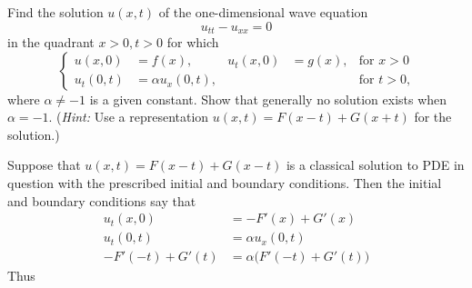 \begin{problem}
  Find the solution \(u(x,t)\) of the one-dimensional wave equation
  \[
    u_{tt}-u_{xx}=0
  \]
  in the quadrant \(x>0,t>0\) for which
  \[
    \left\{
      \begin{aligned}
        u(x,0)&=f(x),&u_t(x,0)&=g(x),&\text{for \(x>0\)}\\
        u_t(0,t)&=\alpha u_x(0,t),&&&\text{for \(t>0\),}
      \end{aligned}
    \right.
  \]
  where \(\alpha\neq -1\) is a given constant. Show that generally no
  solution exists when \(\alpha=-1\). (\emph{Hint:} Use a representation
  \(u(x,t)=F(x-t)+G(x+t)\) for the solution.)
\end{problem}
\begin{solution}
  Suppose that \(u(x,t)=F(x-t)+G(x-t)\) is a classical solution to PDE in
  question with the prescribed initial and boundary conditions. Then the
  initial and boundary conditions say that
  \begin{equation}
    \label{eq:3:bound-conds}
    \begin{aligned}
      u_t(x,0)
      &=-F'(x)+G'(x)\\
      u_t(0,t)&=\alpha u_x(0,t)\\
      -F'(-t)+G'(t)&=\alpha \bigl(F'(-t)+G'(t)\bigr)
    \end{aligned}
  \end{equation}
  Thus
\end{solution}
\newpage

